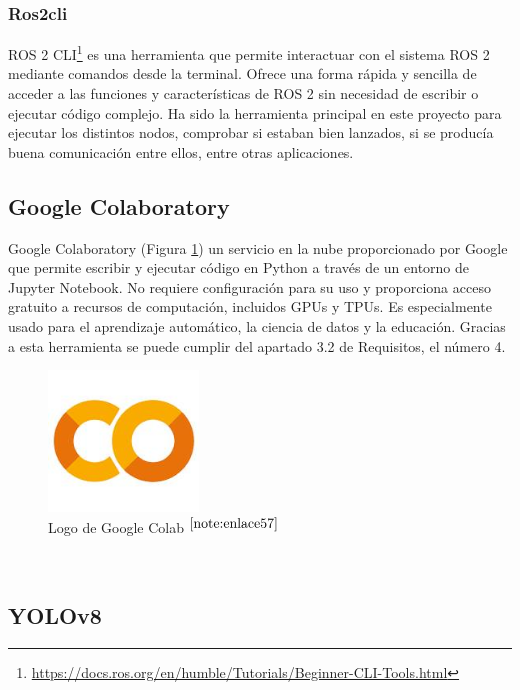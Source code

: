 \subsubsection{Ros2cli}

\acs{ROS} 2 \ac{CLI}\footnote{\url{https://docs.ros.org/en/humble/Tutorials/Beginner-CLI-Tools.html}} es una herramienta que permite interactuar con el sistema ROS 2 mediante comandos desde la terminal. Ofrece una forma rápida y sencilla de acceder a las funciones y características de \acs{ROS} 2 sin necesidad de escribir o ejecutar código complejo. Ha sido la herramienta principal en este proyecto para ejecutar los distintos nodos, comprobar si estaban bien lanzados, si se producía buena comunicación entre ellos, entre otras aplicaciones.


\subsection{Google Colaboratory}

Google Colaboratory (Figura \ref{fig:googlecolab}) un servicio en la nube proporcionado por Google que permite escribir y ejecutar código en Python a través de un entorno de Jupyter Notebook. No requiere configuración para su uso y proporciona acceso gratuito a recursos de computación, incluidos GPUs y TPUs. Es especialmente usado para el aprendizaje automático, la ciencia de datos y la educación. Gracias a esta herramienta se puede cumplir del apartado 3.2 de Requisitos, el número 4.

\begin{figure} [h!]
	\begin{center}
		\includegraphics[width=4cm]{figs/googlecolab.png}
	\end{center}
	\caption{Logo de Google Colab $^{\ref{note:enlace57}}$} 
	\label{fig:googlecolab}
\end{figure}\

\setcounter{footnote}{57} %

\subsection{YOLOv8}

